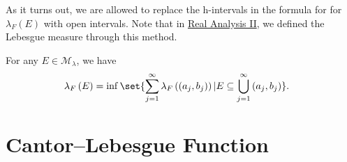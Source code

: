 \documentclass[10pt]{mypackage}
\begin{document}
As it turns out, we are allowed to replace the h-intervals in the formula for for $\lambda_F(E)$ with open intervals. Note that in \href{https://ai.avinash-iyer.com/Classes_and_Homework/College/Y3/Y3S2,\%20Real\%20II/real_2_notes.pdf}{Real Analysis II}, we defined the Lebesgue measure through this method.
\begin{lemma}
  For any $E\in \mathcal{M}_{\lambda}$, we have
  \begin{align*}
    \lambda_F\left( E \right) &= \inf\set{\sum_{j=1}^{\infty}\lambda_F\left( \left( a_j,b_j \right) \right) | E\subseteq \bigcup_{j=1}^{\infty}\left( a_j,b_j \right)}.
  \end{align*}
  
\end{lemma}

\section{Cantor--Lebesgue Function}%
\end{document}
